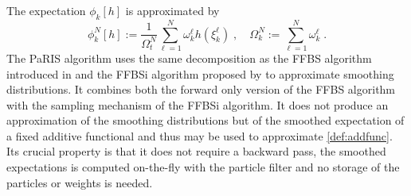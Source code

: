 \documentclass[12pt,draft]{article}
\newcommand{\eqsp}{\;}
\newcommand{\1}{\mathrm{1}}
\begin{document}
The expectation $\phi_{k}[h]$ is approximated by
\[
\phi^N_{k}[h] := \frac{1}{\Omega_t^N} \sum_{\ell=1}^N \omega_k^{\ell} h \left(\xi^{\ell}_k \right)\eqsp,\quad\Omega_k^N:= \sum_{\ell=1}^N \omega_k^{\ell}\eqsp.
\]
The PaRIS algorithm uses the same decomposition as the FFBS algorithm introduced in \cite{doucetgodsillandrieu:2000} and the FFBSi algorithm proposed by \cite{godsill:doucet:west:2004} to approximate smoothing distributions. 
It combines both the forward only version of the FFBS algorithm with the sampling mechanism of the FFBSi algorithm. It does not produce an approximation of the smoothing distributions but of the smoothed expectation of a fixed additive functional and thus  may be used to approximate \eqref{def:addfunc}. 
Its crucial property is that it does not require a backward pass, the smoothed expectations is computed on-the-fly with the particle filter and no storage of the particles or weights is needed. 
\end{document}
